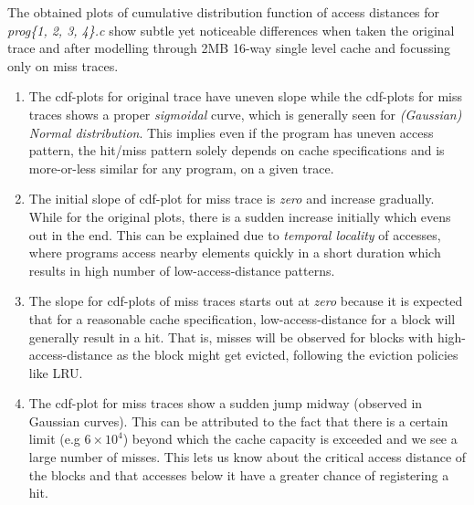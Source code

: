 
The obtained plots of cumulative distribution function of access distances for \textit{prog\{1, 2, 3, 4\}.c} show subtle yet noticeable differences when taken the original trace and after modelling through 2MB 16-way single level cache and focussing only on miss traces.

\begin{enumerate}
	\item The cdf-plots for original trace have uneven slope while the cdf-plots for miss traces shows a 
	proper \textit{sigmoidal} curve, which is generally seen for \textit{(Gaussian)}\textit{ Normal distribution}. 
	This implies even if the program has uneven access pattern, the hit/miss pattern solely depends on cache 
	specifications and is more-or-less similar for any program, on a given trace.
	
	\item The initial slope of cdf-plot for miss trace is \textit{zero} and increase gradually. While for the
	original plots, there is a sudden increase initially which evens out in the end. This can be explained
	due to \textit{temporal locality} of accesses, where programs access nearby elements quickly in a short
	duration which results in high number of low-access-distance patterns.
	
	\item The slope for cdf-plots of miss traces starts out at \textit{zero} because it is expected that for
	a reasonable cache specification, low-access-distance for a block will generally result in a hit. That is,
	misses will be observed for blocks with high-access-distance as the block might get evicted, following
	the eviction policies like LRU.
	
	\item The cdf-plot for miss traces show a sudden jump midway (observed in Gaussian curves). This can be
	attributed to the fact that there is a certain limit (e.g $6 \times 10^{4}$) beyond which the cache 
	capacity is exceeded and we see a large number of misses. This lets us know about the critical access
	distance of the blocks and that accesses below it have a greater chance of registering a hit.
\end{enumerate}